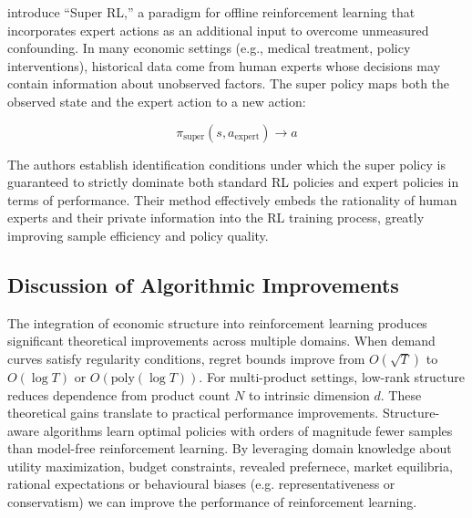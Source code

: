 \citet{WangQiShi2023} introduce ``Super RL,'' a paradigm for offline reinforcement learning that incorporates expert actions as an additional input to overcome unmeasured confounding. In many economic settings (e.g., medical treatment, policy interventions), historical data come from human experts whose decisions may contain information about unobserved factors. The super policy maps both the observed state and the expert action to a new action:

\begin{equation}
\pi_{\text{super}}(s, a_{\text{expert}}) \rightarrow a
\end{equation}

The authors establish identification conditions under which the super policy is guaranteed to strictly dominate both standard RL policies and expert policies in terms of performance. Their method effectively embeds the rationality of human experts and their private information into the RL training process, greatly improving sample efficiency and policy quality.

\subsection{Discussion of Algorithmic Improvements}

The integration of economic structure into reinforcement learning produces significant theoretical improvements across multiple domains. When demand curves satisfy regularity conditions, regret bounds improve from $O(\sqrt{T})$ to $O(\log T)$ or $O(\text{poly}(\log T))$. For multi-product settings, low-rank structure reduces dependence from product count $N$ to intrinsic dimension $d$. These theoretical gains translate to practical performance improvements. Structure-aware algorithms learn optimal policies with orders of magnitude fewer samples than model-free reinforcement learning. By leveraging domain knowledge about utility maximization, budget constraints, revealed prefernece, market equilibria, rational expectations or behavioural biases (e.g. representativeness or conservatism) we can improve the performance of reinforcement learning. 